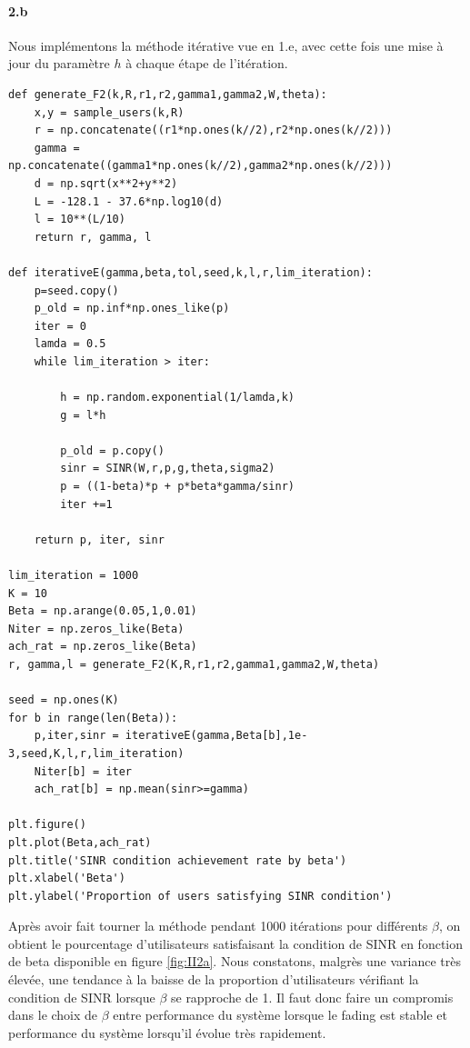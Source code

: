 \documentclass[a4paper,11pt,2]{article}
\begin{document}
\paragraph{2.b} Nous implémentons la méthode itérative vue en 1.e, avec cette fois une mise à jour du paramètre $h$ à chaque étape de l'itération.
\begin{center}
\begin{lstlisting}
def generate_F2(k,R,r1,r2,gamma1,gamma2,W,theta):
    x,y = sample_users(k,R)
    r = np.concatenate((r1*np.ones(k//2),r2*np.ones(k//2)))
    gamma = np.concatenate((gamma1*np.ones(k//2),gamma2*np.ones(k//2)))
    d = np.sqrt(x**2+y**2)
    L = -128.1 - 37.6*np.log10(d)
    l = 10**(L/10)
    return r, gamma, l

def iterativeE(gamma,beta,tol,seed,k,l,r,lim_iteration):
    p=seed.copy()
    p_old = np.inf*np.ones_like(p)
    iter = 0
    lamda = 0.5
    while lim_iteration > iter:

        h = np.random.exponential(1/lamda,k)
        g = l*h

        p_old = p.copy()
        sinr = SINR(W,r,p,g,theta,sigma2)
        p = ((1-beta)*p + p*beta*gamma/sinr)
        iter +=1
        
    return p, iter, sinr

lim_iteration = 1000
K = 10
Beta = np.arange(0.05,1,0.01)
Niter = np.zeros_like(Beta)
ach_rat = np.zeros_like(Beta)
r, gamma,l = generate_F2(K,R,r1,r2,gamma1,gamma2,W,theta)

seed = np.ones(K)
for b in range(len(Beta)):
    p,iter,sinr = iterativeE(gamma,Beta[b],1e-3,seed,K,l,r,lim_iteration)
    Niter[b] = iter
    ach_rat[b] = np.mean(sinr>=gamma)

plt.figure()
plt.plot(Beta,ach_rat)
plt.title('SINR condition achievement rate by beta')
plt.xlabel('Beta')
plt.ylabel('Proportion of users satisfying SINR condition')
\end{lstlisting}
\end{center}

Après avoir fait tourner la méthode pendant 1000 itérations pour différents $\beta$, on obtient le pourcentage d'utilisateurs satisfaisant la condition de SINR en fonction de beta disponible en figure \ref{fig:II2a}. Nous constatons, malgrès une variance très élevée, une tendance à la baisse de la proportion d'utilisateurs vérifiant la condition de SINR lorsque $\beta$ se rapproche de 1. Il faut donc faire un compromis dans le choix de $\beta$ entre performance du système lorsque le fading est stable et performance du système lorsqu'il évolue très rapidement.
\end{document}
